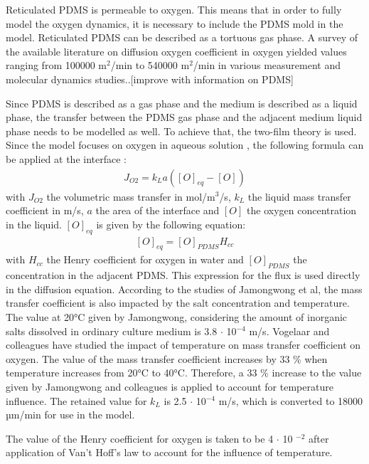 \documentclass[11pt,a4paper]{article}
\begin{document}
Reticulated PDMS is permeable to oxygen. This means that in order to fully model the oxygen dynamics, it is necessary to include the PDMS mold in the model. Reticulated PDMS can be described as a tortuous gas phase. A survey of the available literature on diffusion oxygen coefficient in oxygen yielded values ranging from 100000 \textmu m$^2$/min to 540000 \textmu m$^2$/min in various measurement and molecular dynamics studies.\cite{Ullal2014}\cite{Sudibjo2011}\cite{Park2006}\cite{Ziomek1991}\cite{KimM2013}.[improve with information on PDMS]

Since PDMS is described as a gas phase and the medium is described as a liquid phase, the transfer between the PDMS gas phase and the adjacent medium liquid phase needs to be modelled as well. To achieve that, the two-film theory is used.\cite{Doran2012} Since the model focuses on oxygen in aqueous solution , the following formula can be applied at the interface :
\begin{align}
\label{eqn:2FT} J_{O2} =  k_L a([O]_{eq}-[O]) 
\end{align}
with $J_{O2}$ the volumetric mass transfer in mol/m$^3$/s, $k_L$ the liquid mass transfer coefficient in m/s, $a$ the area of the interface and $[O]$ the oxygen concentration in the liquid. $[O]_{eq}$ is given by the following equation:
\begin{align}
\label{eqn:HO} [O]_{eq} =  [O]_{PDMS}H_{cc} 
\end{align}
with $H_{cc}$ the Henry coefficient for oxygen in water and $[O]_{PDMS}$ the concentration in the adjacent PDMS. This expression for the flux is used directly in the diffusion equation. According to the studies of Jamongwong et al, the mass transfer coefficient is also impacted by the salt concentration and temperature. The value at 20°C given by Jamongwong, considering the amount of inorganic salts dissolved in ordinary culture medium is 3.8 $\cdot$ 10$^{-4}$ m/s\cite{Jamongwong2010}. Vogelaar and colleagues have studied the impact of temperature on mass transfer coefficient on oxygen.\cite{Vogelaar2000} The value of the mass transfer coefficient increases by 33 \% when temperature increases from 20°C to 40°C. Therefore, a 33 \% increase to the value given by Jamongwong and colleagues is applied to account for temperature influence. The retained value for $k_L$ is 2.5 $\cdot$ 10$^{-4}$ m/s, which is converted to 18000 µm/min for use in the model. 

The value of the Henry coefficient for oxygen is taken to be 4 $\cdot$ 10 $^{-2}$ after application of Van't Hoff's law to account for the influence of temperature.
\end{document}
